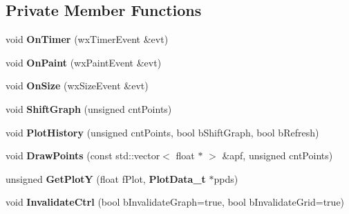 \subsection*{Private Member Functions}
\begin{DoxyCompactItemize}
\item 
void {\bfseries OnTimer} (wxTimerEvent \&evt)\label{classCOScopeCtrl_a98159e1d4e7c89fe536442b54eda1204}

\item 
void {\bfseries OnPaint} (wxPaintEvent \&evt)\label{classCOScopeCtrl_af85d6ea6040acfc0758af9bf5a8fca4b}

\item 
void {\bfseries OnSize} (wxSizeEvent \&evt)\label{classCOScopeCtrl_ad7ab509984a67278afdb5513e1cdd098}

\item 
void {\bfseries ShiftGraph} (unsigned cntPoints)\label{classCOScopeCtrl_a2415165bee49723ffae811c789f1f841}

\item 
void {\bfseries PlotHistory} (unsigned cntPoints, bool bShiftGraph, bool bRefresh)\label{classCOScopeCtrl_a12f92249b02978493638af5d695ae379}

\item 
void {\bfseries DrawPoints} (const std::vector$<$ float $\ast$ $>$ \&apf, unsigned cntPoints)\label{classCOScopeCtrl_a5d6b2a4f6a1f588859861a5e1b6d6457}

\item 
unsigned {\bfseries GetPlotY} (float fPlot, {\bf PlotData\_\-t} $\ast$ppds)\label{classCOScopeCtrl_ad73b4695d729da4a4b83e02db5d349de}

\item 
void {\bfseries InvalidateCtrl} (bool bInvalidateGraph=true, bool bInvalidateGrid=true)\label{classCOScopeCtrl_a1d3f33babf29e50af6e38710feef6110}

\end{DoxyCompactItemize}
